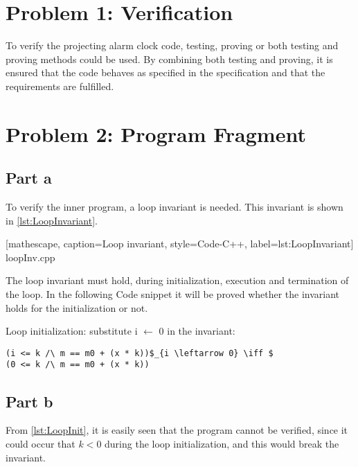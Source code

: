 \documentclass[Main_Assignment4]{subfiles}
\begin{document}
\section{Problem 1: Verification}
To verify the projecting alarm clock code, testing, proving or both testing and proving methods could be used. 
By combining both testing and proving, it is ensured that the code behaves as specified in the specification and that the requirements are fulfilled.

\section{Problem 2: Program Fragment} %
\label{sec:problem_2_program_fragment}


\subsection{Part a}
To verify the inner program, a loop invariant is needed. 
This invariant is shown in \codeTitle \ref{lst:LoopInvariant}. 


[mathescape, caption=Loop invariant, style=Code-C++, label=lst:LoopInvariant]
{loopInv.cpp}

The loop invariant must hold, during initialization, execution and termination of the loop. In the following Code snippet it will be proved whether the invariant holds for the initialization or not.


Loop initialization: substitute i $\leftarrow$ 0 in the invariant:
\begin{lstlisting}[mathescape, caption=Loop initialization, style=Code-C++, label=lst:LoopInit]
(i <= k /\ m == m0 + (x * k))$_{i \leftarrow 0} \iff $ 
(0 <= k /\ m == m0 + (x * k))  
\end{lstlisting}

\subsection{Part b}
From \codeTitle \ref{lst:LoopInit}, it is easily seen that the program cannot be verified, since it could occur that $k < 0$ during the loop initialization, and this would break the invariant.
\end{document}
